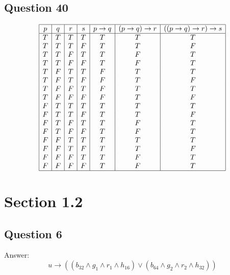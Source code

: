 \documentclass{article}
\begin{document}
\subsection*{Question 40}
\[
\begin{array}{|c|c|c|c|c|c|c|}
\hline
p & q & r & s & p \to q & (p \to q) \to r & ((p \to q) \to r) \to s \\
\hline
T & T & T & T & T & T & T \\
T & T & T & F & T & T & F \\
T & T & F & T & T & F & T \\
T & T & F & F & T & F & T \\
T & F & T & T & F & T & T \\
T & F & T & F & F & T & F \\
T & F & F & T & F & T & T \\
T & F & F & F & F & T & F \\
F & T & T & T & T & T & T \\
F & T & T & F & T & T & F \\
F & T & F & T & T & F & T \\
F & T & F & F & T & F & T \\
F & F & T & T & T & T & T \\
F & F & T & F & T & T & F \\
F & F & F & T & T & F & T \\
F & F & F & F & T & F & T \\
\hline
\end{array}
\]\newline


\section*{Section 1.2}

\subsection*{Question 6}

Answer:
\[
u \to \left( (b_{32} \land g_1 \land r_1 \land h_{16}) \lor (b_{64} \land g_2 \land r_2 \land h_{32}) \right)
\]
\end{document}
